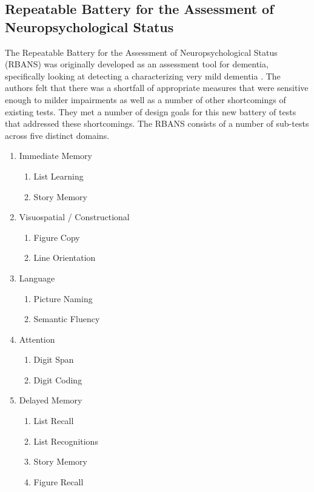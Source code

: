 \documentclass[10pt, letterpaper, twoside, openany]{book}
\begin{document}
\subsection{Repeatable Battery for the Assessment of Neuropsychological Status}
The Repeatable Battery for the Assessment of Neuropsychological Status (RBANS) was originally developed as an assessment tool for dementia, specifically looking at detecting a characterizing very mild dementia \cite{Randolph1998}. The authors felt that there was a shortfall of appropriate measures that were sensitive enough to milder impairments as well as a number of other shortcomings of existing tests. They met a number of design goals for this new battery of tests that addressed these shortcomings. The RBANS consists of a number of sub-tests across five distinct domains.

\begin{enumerate}
	\item Immediate Memory 
	\begin{enumerate}
		\item{List Learning}
		\item{Story Memory}
	\end{enumerate}
	\item Visuospatial / Constructional
	\begin{enumerate}
		\item{Figure Copy}
		\item{Line Orientation}
	\end{enumerate}
	\item Language
	\begin{enumerate}
		\item{Picture Naming}
		\item{Semantic Fluency}
	\end{enumerate}
	\item Attention
	\begin{enumerate}
		\item{Digit Span}
		\item{Digit Coding}
	\end{enumerate}
	\item Delayed Memory
	\begin{enumerate}
		\item{List Recall}
		\item{List Recognitions}
		\item{Story Memory}
		\item{Figure Recall}
	\end{enumerate}
\end{enumerate}
\end{document}
